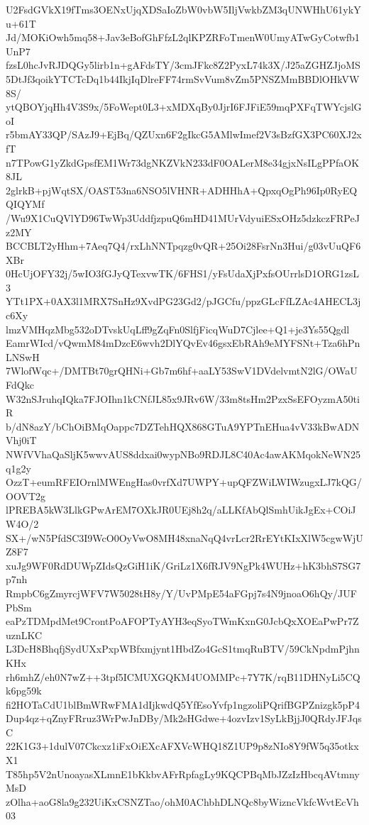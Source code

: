 U2FsdGVkX19fTms3OENxUjqXDSaIoZbW0vbW5IljVwkbZM3qUNWHhU61ykYu+61T
Jd/MOKiOwh5mq58+Jav3eBofGhFfzL2qlKPZRFoTmenW0UmyATwGyCotwfb1UnP7
fzsL0hcJvRJDQGy5lirb1n+gAFdsTY/3cmJFkc8Z2PyxL74k3X/J25aZGHZJjoMS
5DtJf3qoikYTCTcDq1b44IkjIqDlreFF74rmSvVum8vZm5PNSZMmBBDlOHkVW8S/
ytQBOYjqHh4V3S9x/5FoWept0L3+xMDXqBy0JjrI6FJFiE59mqPXFqTWYcjslGoI
r5bmAY33QP/SAzJ9+EjBq/QZUxn6F2gIkcG5AMlwImef2V3sBzfGX3PC60XJ2xfT
n7TPowG1yZkdGpsfEM1Wr73dgNKZVkN233dF0OALerM8e34gjxNsILgPPfaOK8JL
2glrkB+pjWqtSX/OAST53na6NSO5lVHNR+ADHHhA+QpxqOgPh96Ip0RyEQQIQYMf
/Wu9X1CuQVlYD96TwWp3UddfjzpuQ6mHD41MUrVdyuiESxOHz5dzkczFRPeJz2MY
BCCBLT2yHhm+7Aeq7Q4/rxLhNNTpqzg0vQR+25Oi28FsrNn3Hui/g03vUuQF6XBr
0HcUjOFY32j/5wIO3fGJyQTexvwTK/6FHS1/yFsUdaXjPxfsOUrrlsD1ORG1zsL3
YTt1PX+0AX3l1MRX7SnHz9XvdPG23Gd2/pJGCfu/ppzGLcFfLZAc4AHECL3jc6Xy
lmzVMHqzMbg532oDTvskUqLff9gZqFn0SlfjFicqWuD7Cjlee+Q1+je3Ys55Qgdl
EamrWIcd/vQwmM84mDzcE6wvh2DlYQvEv46gsxEbRAh9eMYFSNt+Tza6hPnLNSwH
7WlofWqc+/DMTBt70grQHNi+Gb7m6hf+aaLY53SwV1DVdelvmtN2lG/OWaUFdQkc
W32nSJruhqIQka7FJOIhn1kCNfJL85x9JRv6W/33m8tsHm2PzxSsEFOyzmA50tiR
b/dN8azY/bChOiBMqOappc7DZTehHQX868GTuA9YPTnEHua4vV33kBwADNVhj0iT
NWfVVhaQaSljK5wwvAUS8ddxai0wypNBo9RDJL8C40Ac4awAKMqokNeWN25q1g2y
OzzT+eumRFEIOrnlMWEngHas0vrfXd7UWPY+upQFZWiLWIWzugxLJ7kQG/OOVT2g
lPREBA5kW3LlkGPwArEM7OXkJR0UEj8h2q/aLLKfAbQlSmhUikJgEx+COiJW4O/2
SX+/wN5PfdSC3I9WcO0OyVwO8MH48xnaNqQ4vrLcr2RrEYtKIxXlW5cgwWjUZ8F7
xuJg9WF0RdDUWpZIdsQzGiH1iK/GriLz1X6fRJV9NgPk4WUHz+hK3bhS7SG7p7nh
RmpbC6gZmyrcjWFV7W5028tH8y/Y/UvPMpE54aFGpj7s4N9jnoaO6hQy/JUFPbSm
eaPzTDMpdMet9CrontPoAFOPTyAYH3eqSyoTWmKxnG0JcbQxXOEaPwPr7ZuznLKC
L3DcH8BhqfjSydUXxPxpWBfxmjynt1HbdZo4GcS1tmqRuBTV/59CkNpdmPjhnKHx
rh6mhZ/eh0N7wZ++3tpf5ICMUXGQKM4UOMMPc+7Y7K/rqB11DHNyLi5CQk6pg59k
fi2HOTaCdU1blBmWRwFMA1dIjkwdQ5YfEsoYvfp1ngzoliPQrifBGPZnizgk5pP4
Dup4qz+qZnyFRruz3WrPwJnDBy/Mk2sHGdwe+4ozvIzv1SyLkBjjJ0QRdyJFJqsC
22K1G3+1dulV07Ckcxz1iFxOiEXcAFXVcWHQ18Z1UP9p8zNIo8Y9fW5q35otkxX1
T85hp5V2nUnoayasXLmnE1bKkbvAFrRpfagLy9KQCPBqMbJZzIzHbcqAVtmnyMsD
zOlha+aoG8la9g232UiKxCSNZTao/ohM0AChbhDLNQc8byWizncVkfcWvtEcVh03
